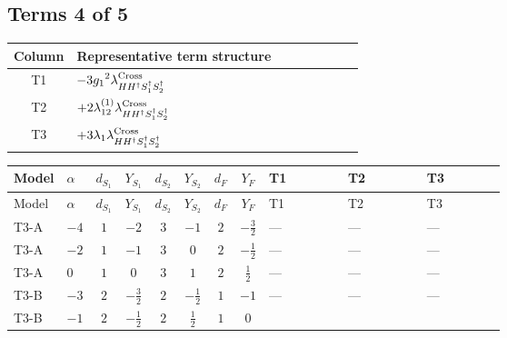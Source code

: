 \documentclass[8pt]{article}
\begin{document}
\begin{landscape}
\subsection*{Terms 4 of 5}
\begin{center}
\begin{tabular}{@{}c >{\raggedright\arraybackslash}p{0.82\linewidth}@{}}
\toprule
Column & Representative term structure \\
\midrule
T1 & \(\displaystyle -3 {g_1}^2 {\lambda_{H H^\dagger S_1^\dagger S_2^\dagger}^{\rm Cross}}\) \\
\midrule
T2 & \(\displaystyle +2 {\lambda_{12}^{(1)}} {\lambda_{H H^\dagger S_1^\dagger S_2^\dagger}^{\rm Cross}}\) \\
\midrule
T3 & \(\displaystyle +3 {\lambda_1} {\lambda_{H H^\dagger S_1^\dagger S_2^\dagger}^{\rm Cross}}\) \\
\midrule
\bottomrule
\end{tabular}
\end{center}
\smallskip
\tiny
\begin{longtable}{@{}llcccccc >{\raggedright\arraybackslash}p{0.21\linewidth} >{\raggedright\arraybackslash}p{0.21\linewidth} >{\raggedright\arraybackslash}p{0.21\linewidth}@{}}
\toprule
Model & $\alpha$ & $d_{S_1}$ & $Y_{S_1}$ & $d_{S_2}$ & $Y_{S_2}$ & $d_F$ & $Y_F$ & T1 & T2 & T3 \\
\midrule
\endfirsthead
\toprule
Model & $\alpha$ & $d_{S_1}$ & $Y_{S_1}$ & $d_{S_2}$ & $Y_{S_2}$ & $d_F$ & $Y_F$ & T1 & T2 & T3 \\
\midrule
\endhead
T3-A & $-4$ & $1$ & $-2$ & $3$ & $-1$ & $2$ & $-\frac{3}{2}$ & --- & --- & --- \\
\midrule
T3-A & $-2$ & $1$ & $-1$ & $3$ & $0$ & $2$ & $-\frac{1}{2}$ & --- & --- & --- \\
\midrule
T3-A & $0$ & $1$ & $0$ & $3$ & $1$ & $2$ & $\frac{1}{2}$ & --- & --- & --- \\
\midrule
T3-B & $-3$ & $2$ & $-\frac{3}{2}$ & $2$ & $-\frac{1}{2}$ & $1$ & $-1$ & --- & --- & --- \\
\midrule
T3-B & $-1$ & $2$ & $-\frac{1}{2}$ & $2$ & $\frac{1}{2}$ & $1$ & $0$ & \scriptsize\adjustbox{max width=\linewidth}{$\begin{gathered} -3 {g_1}^2 {\lambda_{H H^\dagger S_1^\dagger S_2^\dagger}^{\rm Cross}}\end{gathered}$} & \scriptsize\adjustbox{max width=\linewidth}{$\begin{gathered} +2 {\lambda_{12}^{(1)}} {\lambda_{H H^\dagger S_1^\dagger S_2^\dagger}^{\rm Cross}}\end{gathered}$} & \scriptsize\adjustbox{max width=\linewidth}{$\begin{gathered} +3 {\lambda_1} {\lambda_{H H^\dagger S_1^\dagger S_2^\dagger}^{\rm Cross}}\end{gathered}$} \\

\end{longtable}
\end{landscape}
\end{document}
